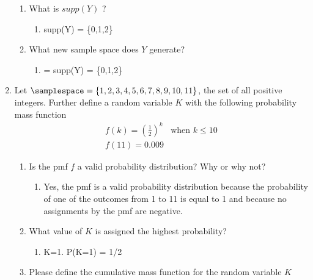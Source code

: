 \documentclass[krantz1,ChapterTOCs]{krantz}
\begin{document}
\begin{enumerate}
\begin{enumerate}
        \item What is $supp(Y)$ ? 
        \begin{enumerate}
            \item {\color{red} supp(Y) = \{0,1,2\}   }
        \end{enumerate}

        \item What new sample space does $Y$ generate?
        \begin{enumerate}
            \item {\color{red}  = supp(Y) = \{0,1,2\}   }
        \end{enumerate}

    \end{enumerate}
    \item Let $\samplespace = \{1,2,3,4,5,6,7,8,9,10,11\}$, the set of all positive integers. Further define a random variable $K$ with the following probability mass function 
    \begin{align*}
        f(k) = \left( \frac{1}{2} \right) ^{k} & \text{when } k \leq 10\\
        f(11) = 0.009
    \end{align*} 
    \begin{enumerate}
        \item Is the pmf $f$ a valid probability distribution? Why or why not?
        
        \begin{enumerate}
            \item {\color{red} Yes, the pmf is a valid probability distribution because the probability of one of the outcomes from 1 to 11 is equal to 1 and because no assignments by the pmf are negative.   }
        \end{enumerate}

        \item What value of $K$ is assigned the highest probability? 
        \begin{enumerate}
            \item {\color{red}  K=1. P(K=1) = 1/2  }
        \end{enumerate}
        
        \item Please define the cumulative mass function for the random variable $K$
        

\end{enumerate}
\end{enumerate}
\end{document}
